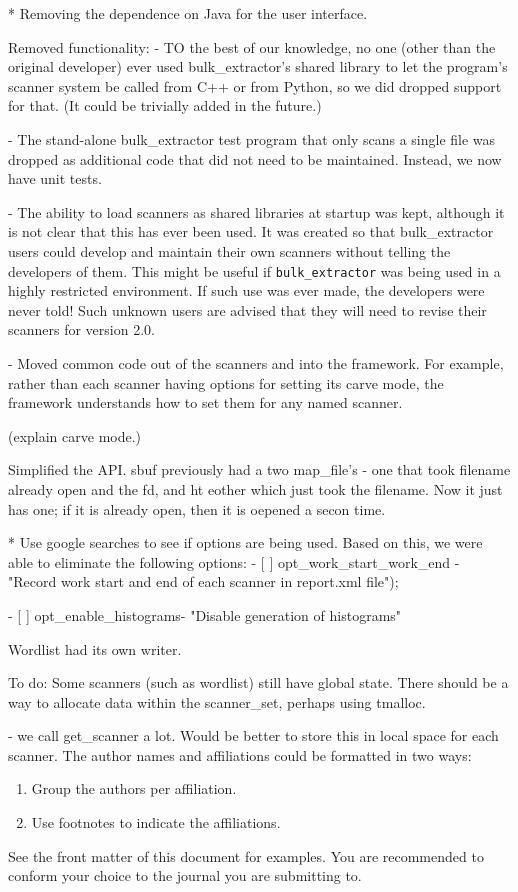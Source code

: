 \documentclass[5p]{elsarticle}
\newcommand{\be}{\texttt{bulk\_extractor}\xspace}
\begin{document}
* Removing the dependence on Java for the user interface.



Removed functionality:
- TO the best of our knowledge, no one (other than the original
developer) ever used bulk\_extractor's shared library to let the
program's scanner system be called from C++ or from Python, so we did
dropped support for that. (It could be trivially added in the future.)

- The stand-alone bulk\_extractor test program that only scans a single
file was dropped as additional code that did not need to be
maintained. Instead, we now have unit tests.

- The ability to load scanners as shared libraries at startup was
kept, although it is not clear that this has ever been used. It was
created so that bulk\_extractor users could develop and maintain their
own scanners without telling the developers of them. This might be
useful if \be was being used in a highly restricted environment. If
such use was ever made, the developers were never told! Such unknown
users are advised that they will need to revise their scanners for
version 2.0.


- Moved common code out of the scanners and into the framework. For
example, rather than each scanner having options for setting its carve
mode, the framework understands how to set them for any named
scanner.

(explain carve mode.)

Simplified the API. sbuf previously had a two map\_file's - one that
took filename already open and the fd, and ht eother which just took
the filename. Now it just has one; if it is already open, then it is
oepened a secon time.


* Use google searches to see if options are being used. Based on this,
we were able to eliminate the following options:
- [ ] opt\_work\_start\_work\_end - "Record work start and end of each scanner in report.xml file");

- [ ] opt\_enable\_histograms- "Disable generation of histograms"

Wordlist had its own writer.


To do:
Some scanners (such as wordlist) still have global state. There should
be a way to allocate data within the scanner\_set, perhaps using
tmalloc.

- we call get\_scanner a lot. Would be better to store this in local
space for each scanner.
The author names and affiliations could be formatted in two ways:
\begin{enumerate}[(1)]
\item Group the authors per affiliation.
\item Use footnotes to indicate the affiliations.
\end{enumerate}
See the front matter of this document for examples. You are recommended to conform your choice to the journal you are submitting to.
\end{document}
